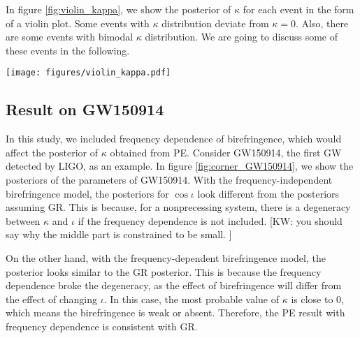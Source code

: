 \documentclass[aps,prd,twocolumn,superscriptaddress,preprintnumbers,floatfix,nofootinbib]{revtex4-2}
\newcommand{\kw}[1]{{\color{rb4}[KW: #1 ]}}
\begin{document}
In figure \ref{fig:violin_kappa}, we show the posterior of $\kappa$ for each event in the form of a violin plot.
Some events with $\kappa$ distribution deviate from $\kappa=0$.
Also, there are some events with bimodal $\kappa$ distribution.
We are going to discuss some of these events in the following.

\begin{figure*}[ht]
    \texttt{[image: figures/violin\_kappa.pdf]}
    \caption{
        The violin plot shows the posterior of $\kappa$ for all 69 events in this study.
        Each violin represents a different event.
        The violins are sorted by the quotient of the median and standard deviation of the posterior.
        The blue horizontal line represents the median value of $\mu$, and the blue region represents 1 $\sigma$ confidence level.
        The Orange horizontal line represents $\kappa=0$.
        This plot shows that some events with $\kappa$ distribution significantly deviate from $0$.
    }
    \label{fig:violin_kappa}
\end{figure*}




\subsection{Result on GW150914}
In this study, we included frequency dependence of birefringence, which would affect the posterior of $\kappa$ obtained from PE.
Consider GW150914, the first GW detected by LIGO, as an example.
In figure \ref{fig:corner_GW150914}, we show the posteriors of the parameters of GW150914.
With the frequency-independent birefringence model, the posteriors for $\cos\iota$ look different from the posteriors assuming GR.
This is because, for a nonprecessing system, there is a degeneracy between $\kappa$ and $\iota$ if the frequency dependence is not included.
\kw{you should say why the middle part is constrained to be small.}

On the other hand, with the frequency-dependent birefringence model, the posterior looks similar to the GR posterior.
This is because the frequency dependence broke the degeneracy, as the effect of birefringence will differ from the effect of changing $\iota$.
In this case, the most probable value of $\kappa$ is close to $0$, which means the birefringence is weak or absent.
Therefore, the PE result with frequency dependence is consistent with GR.
\end{document}
